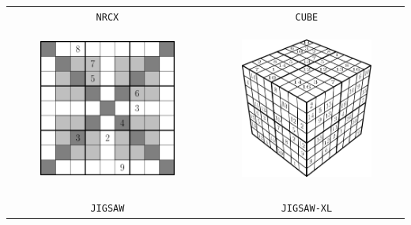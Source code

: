 \documentclass[12pt]{article}
\begin{document}
\begin{longtable}{cc}
\\\pagebreak	
\texttt{NRCX} & \texttt{CUBE}\\	
\begin{minipage}{0.45\textwidth}	
	\begin{center}
		\includegraphics[width=0.7\textwidth]{NRCX}	
	\end{center}
\end{minipage} &
\begin{minipage}{0.45\textwidth}	
	\begin{center}
		\includegraphics[width=0.7\textwidth]{CUBE}	
	\end{center}
\end{minipage} \\ \\
\texttt{JIGSAW} & \texttt{JIGSAW-XL}\\	

\end{longtable}
\end{document}
